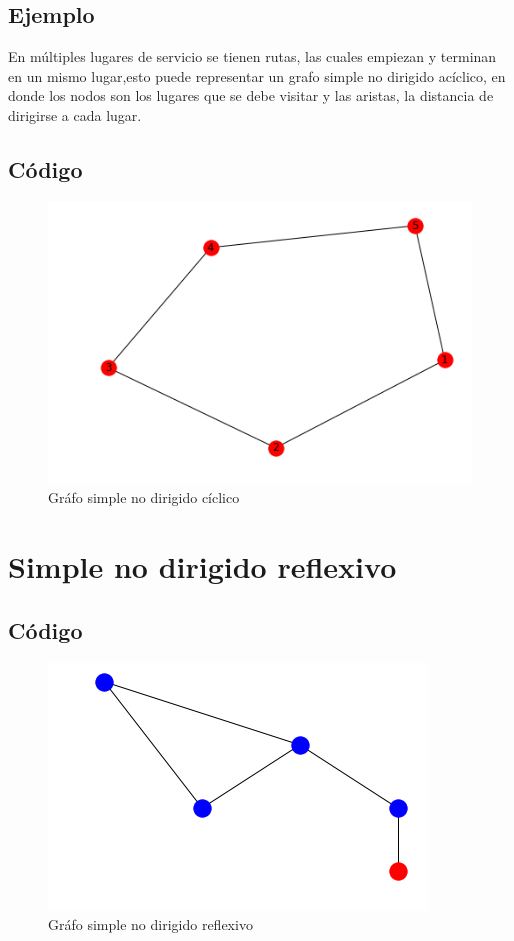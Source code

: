 \documentclass[10pt,a4paper]{article}
\begin{document}
\subsection{Ejemplo} En múltiples lugares de servicio se tienen rutas, las cuales empiezan y terminan en un mismo lugar,esto puede representar un grafo simple no dirigido acíclico, en donde los nodos son los lugares que se debe visitar y las aristas, la distancia de dirigirse a cada lugar.
\subsection{Código}
\begin{figure}[H]
\centering
\includegraphics[scale=.5]{grafosimplenodirigidociclico}
\caption{Gráfo simple no dirigido cíclico}
\end{figure}

\section{Simple no dirigido reflexivo}
\subsection{Código}
\begin{figure}[H]
\centering
\includegraphics[scale=.5]{grafosimplenodirigidoreflexivo}
\caption{Gráfo simple no dirigido reflexivo}
\end{figure}
\end{document}
